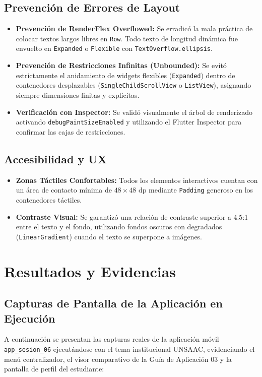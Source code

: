 \documentclass[12pt,a4paper]{article}
\begin{document}
\subsection{Prevención de Errores de Layout}
\begin{itemize}[leftmargin=*]
    \item \textbf{Prevención de RenderFlex Overflowed:} Se erradicó la mala práctica de colocar textos largos libres en \texttt{Row}. Todo texto de longitud dinámica fue envuelto en \texttt{Expanded} o \texttt{Flexible} con \texttt{TextOverflow.ellipsis}.
    \item \textbf{Prevención de Restricciones Infinitas (Unbounded):} Se evitó estrictamente el anidamiento de widgets flexibles (\texttt{Expanded}) dentro de contenedores desplazables (\texttt{SingleChildScrollView} o \texttt{ListView}), asignando siempre dimensiones finitas y explícitas.
    \item \textbf{Verificación con Inspector:} Se validó visualmente el árbol de renderizado activando \texttt{debugPaintSizeEnabled} y utilizando el Flutter Inspector para confirmar las cajas de restricciones.
\end{itemize}

\subsection{Accesibilidad y UX}
\begin{itemize}[leftmargin=*]
    \item \textbf{Zonas Táctiles Confortables:} Todos los elementos interactivos cuentan con un área de contacto mínima de $48 \times 48\text{ dp}$ mediante \texttt{Padding} generoso en los contenedores táctiles.
    \item \textbf{Contraste Visual:} Se garantizó una relación de contraste superior a 4.5:1 entre el texto y el fondo, utilizando fondos oscuros con degradados (\texttt{LinearGradient}) cuando el texto se superpone a imágenes.
\end{itemize}

\section{Resultados y Evidencias}

\subsection{Capturas de Pantalla de la Aplicación en Ejecución}
A continuación se presentan las capturas reales de la aplicación móvil \texttt{app\_sesion\_06} ejecutándose con el tema institucional UNSAAC, evidenciando el menú centralizador, el visor comparativo de la Guía de Aplicación 03 y la pantalla de perfil del estudiante:
\end{document}
